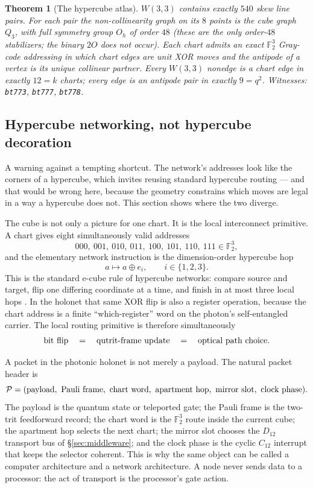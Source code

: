 \documentclass[11pt]{article}
\newtheorem{theorem}{Theorem}[section]
\newcommand{\W}{W(3,3)}
\newcommand{\GF}[1]{\mathbb{F}_{#1}}
\begin{document}
\begin{theorem}[The hypercube atlas]
$\W$ contains exactly $540$ skew line pairs.  For each pair the
non-collinearity graph on its $8$ points is the cube graph $Q_3$, with
full symmetry group $O_h$ of order $48$ (these are the only
order-$48$ stabilizers; the binary $2O$ does not occur).  Each chart
admits an exact $\GF2^3$ Gray-code addressing in which chart edges are
unit XOR moves and the antipode of a vertex is its unique collinear
partner.  Every $\W$ nonedge is a chart edge in exactly $12=k$ charts;
every edge is an antipode pair in exactly $9=q^2$.
\emph{Witnesses: \texttt{bt773}, \texttt{bt777}, \texttt{bt778}.}
\end{theorem}

\subsection{Hypercube networking, not hypercube decoration}

\begin{plainbox}
A warning against a tempting shortcut. The network's addresses look like the corners
of a hypercube, which invites reusing standard hypercube routing --- and that would be
wrong here, because the geometry constrains which moves are legal in a way a hypercube does
not. This section shows where the two diverge.
\end{plainbox}


The cube is not only a picture for one chart.  It is the local
interconnect primitive.  A chart gives eight simultaneously valid
addresses
\[
000,\ 001,\ 010,\ 011,\ 100,\ 101,\ 110,\ 111\in\GF2^3,
\]
and the elementary network instruction is the dimension-order
hypercube hop
\[
a\longmapsto a\oplus e_i,\qquad i\in\{1,2,3\}.
\]
This is the standard e-cube rule of hypercube networks: compare source
and target, flip one differing coordinate at a time, and finish in at
most three local hops \cite{saadschultz}.  In the holonet that same XOR flip is also a
register operation, because the chart address is a finite
``which-register'' word on the photon's self-entangled carrier.  The
local routing primitive is therefore simultaneously
\[
\hbox{bit flip}\quad=\quad\hbox{qutrit-frame update}\quad=\quad
\hbox{optical path choice}.
\]

A packet in the photonic holonet is not merely a payload.  The natural
packet header is
\[
\mathcal{P}=(\hbox{payload},\ \hbox{Pauli frame},\ \hbox{chart word},
\ \hbox{apartment hop},\ \hbox{mirror slot},\ \hbox{clock phase}).
\]
The payload is the quantum state or teleported gate; the Pauli frame is
the two-trit feedforward record; the chart word is the $\GF2^3$ route
inside the current cube; the apartment hop selects the next chart; the
mirror slot chooses the $D_{12}$ transport bus of
\S\ref{sec:middleware}; and the clock phase is the cyclic $C_{12}$
interrupt that keeps the selector coherent.  This is why the same
object can be called a computer architecture and a network
architecture.  A node never sends data to a processor: the act of
transport is the processor's gate action.
\end{document}
